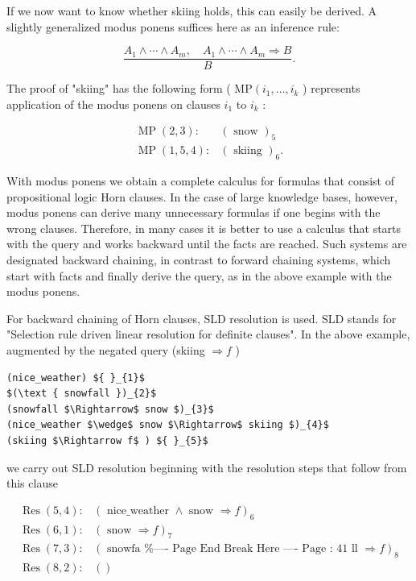 \documentclass[10pt]{article}
\begin{document}
If we now want to know whether skiing holds, this can easily be derived. A slightly generalized modus ponens suffices here as an inference rule:

$$
\frac{A_{1} \wedge \cdots \wedge A_{m}, \quad A_{1} \wedge \cdots \wedge A_{m} \Rightarrow B}{B} .
$$

The proof of "skiing" has the following form ( $\mathrm{MP}\left(i_{1}, \ldots, i_{k}\right.$ ) represents application of the modus ponens on clauses $i_{1}$ to $i_{k}$ :

$$
\begin{array}{ll}
\operatorname{MP}(2,3): & (\text { snow })_{5} \\
\operatorname{MP}(1,5,4): & (\text { skiing })_{6} .
\end{array}
$$

With modus ponens we obtain a complete calculus for formulas that consist of propositional logic Horn clauses. In the case of large knowledge bases, however, modus ponens can derive many unnecessary formulas if one begins with the wrong clauses. Therefore, in many cases it is better to use a calculus that starts with the query and works backward until the facts are reached. Such systems are designated backward chaining, in contrast to forward chaining systems, which start with facts and finally derive the query, as in the above example with the modus ponens.

For backward chaining of Horn clauses, SLD resolution is used. SLD stands for "Selection rule driven linear resolution for definite clauses". In the above example, augmented by the negated query (skiing $\Rightarrow f$ )

\begin{verbatim}
(nice_weather) ${ }_{1}$
$(\text { snowfall })_{2}$
(snowfall $\Rightarrow$ snow $)_{3}$
(nice_weather $\wedge$ snow $\Rightarrow$ skiing $)_{4}$
(skiing $\Rightarrow f$ ) ${ }_{5}$
\end{verbatim}

we carry out SLD resolution beginning with the resolution steps that follow from this clause

$$
\begin{array}{ll}
\operatorname{Res}(5,4): & (\text { nice_weather } \wedge \text { snow } \Rightarrow f)_{6} \\
\operatorname{Res}(6,1): & (\text { snow } \Rightarrow f)_{7} \\
\operatorname{Res}(7,3): & (\text { snowfa
ll } \Rightarrow f)_{8} \\
\operatorname{Res}(8,2): & ()
\end{array}
$$
\end{document}
